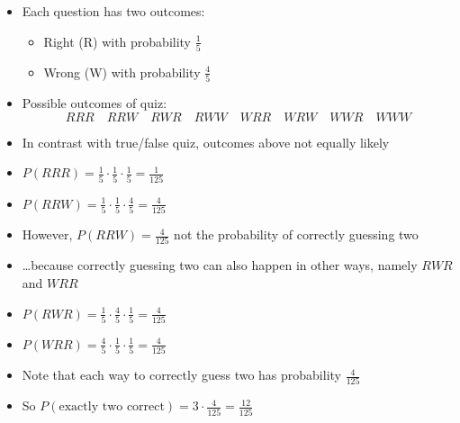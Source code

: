 \documentclass[handout,xcolor=dvipsnames]{beamer}
\theoremstyle{definition}
\begin{document}
\begin{frame}
\begin{itemize}
\item Each question has two outcomes:
\begin{itemize}
\item Right (R) with probability $\frac{1}{5}$
\item Wrong (W) with probability $\frac{4}{5}$
\end{itemize}
\item Possible outcomes of quiz:
\[RRR\quad RRW\quad RWR\quad RWW\quad WRR\quad WRW\quad WWR\quad WWW\]
\item In contrast with true/false quiz, outcomes above not equally likely
\item $P\left(RRR\right)=\frac{1}{5}\cdot\frac{1}{5}\cdot\frac{1}{5}
=\frac{1}{125}$
\item $P\left(RRW\right)=\frac{1}{5}\cdot\frac{1}{5}\cdot\frac{4}{5}
=\frac{4}{125}$
\end{itemize}
\end{frame}

\begin{frame}
\begin{itemize}
\item However, $P\left(RRW\right)=\frac{4}{125}$
\alert{not} the probability of correctly guessing two
\item \dots because correctly guessing two can also happen
in other ways, namely $RWR$ and $WRR$
\item $P\left(RWR\right)=\frac{1}{5}\cdot\frac{4}{5}\cdot\frac{1}{5}
=\frac{4}{125}$
\item $P\left(WRR\right)=\frac{4}{5}\cdot\frac{1}{5}\cdot\frac{1}{5}
=\frac{4}{125}$
\item Note that each way to correctly guess two has probability
$\frac{4}{125}$
\item So $P\left(\text{exactly two correct}\right)=3\cdot\frac{4}{125}
=\frac{12}{125}$
\end{itemize}
\end{frame}
\end{document}
